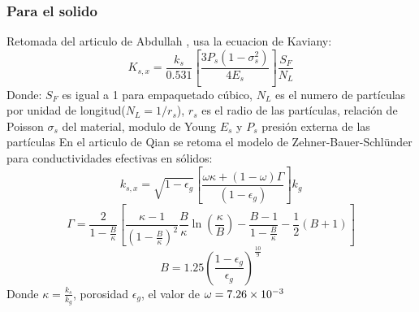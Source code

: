 \documentclass[12pt,letterpaper,final]{article}%
\begin{document}
\subsubsection{Para el solido}
Retomada del articulo de Abdullah \cite{ALI2025}, usa la ecuacion de Kaviany\cite{kaviany2012}:
\begin{equation}\label{Ksx_kaviany}
	K_{s,x} = \frac{k_s}{0.531}\left[ \frac{3P_s(1-\sigma_s^2)}{4E_s} \right]\frac{S_F}{N_L}
\end{equation}
Donde: $S_F$ es igual a 1 para empaquetado cúbico, $N_L$ es el numero de partículas por unidad de longitud($N_L=1/r_s$), $r_s$ es el radio de las partículas, relación de Poisson $\sigma_s$ del material, modulo de Young $E_s$ y $P_s$ presión externa de las partículas
\newline
En el articulo de Qian \cite{QIAN2018} se retoma el modelo de Zehner-Bauer-Schlünder para conductividades efectivas en sólidos:
\begin{equation}\label{Ksx_ZBS}
	k_{s,x} = \sqrt{1-\epsilon_g} \left[\frac{ \omega \kappa + (1-\omega)\Gamma }{(1-\epsilon_g)}\right]k_g 
\end{equation}
\begin{equation*}
	\Gamma = \frac{2}{1-\frac{B}{\kappa}} \left[ \frac{\kappa - 1}{(1-\frac{B}{\kappa})^2} \frac{B}{\kappa} \ln\left(\frac{\kappa}{B}\right) - \frac{B-1}{1-\frac{B}{\kappa}} - \frac{1}{2}(B+1)  \right]
\end{equation*}
\begin{equation*}
	B = 1.25 \left( \frac{1-\epsilon_g}{\epsilon_g} \right)^{\frac{10}{9}}
\end{equation*}
Donde $\kappa = \frac{k_s}{k_g}$, porosidad $\epsilon_g$, el valor de $\omega=\num{7.26E-3}$
\newpage
\printbibliography
\end{document}
